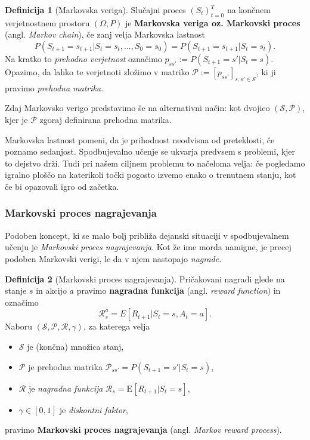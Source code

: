 \documentclass[12pt,a4paper]{amsart}
\theoremstyle{definition} %
\newtheorem{definicija}{Definicija}[section]
\theoremstyle{plain} %
\begin{document}
\begin{definicija}[Markovska veriga]
    Slučajni proces $(S_t)_{t=0}^T$ na končnem verjetnostnem prostoru 
    $(\Omega, P)$ je \textbf{Markovska veriga oz. Markovski proces} (angl. \textit{Markov 
    chain}), če zanj velja Markovska lastnost
    $$
    P(S_{t+1} = s_{t+1} | S_{t} = s_{t}, ..., S_0 = s_0) = P(S_{t+1} = s_{t+1} | S_{t} = s_{t}).
    $$
    Na kratko to \textit{prehodno verjetnost} označimo $p_{ss'} := P(S_{t+1} = s' | S_{t} = s)$.
    Opazimo, da lahko te verjetnoti zložimo v matriko $\mathcal{P} := 
    [p_{ss'}]_{s,s'\in \mathcal{S} }$, ki ji pravimo \textit{prehodna matrika}.

    Zdaj Markovsko verigo predstavimo še na alternativni način: kot dvojico $(\mathcal{S}, 
    \mathcal{P})$, kjer je $\mathcal{P}$ zgoraj definirana prehodna matrika.
\end{definicija}

Markovska lastnost pomeni, da je prihodnost neodvisna od preteklosti, če poznamo sedanjost. 
Spodbujevalno učenje se ukvarja predvsem s problemi, kjer to dejstvo drži. Tudi pri našem 
ciljnem problemu to načeloma velja: če pogledamo igralno ploščo na katerikoli točki pogosto 
izvemo enako o trenutnem stanju, kot če bi opazovali igro od začetka.

\subsubsection{Markovski proces nagrajevanja}
Podoben koncept, ki se malo bolj približa dejanski situaciji v spodbujevalnem učenju je \textit{
Markovski proces nagrajevanja}. Kot že ime morda namigne, je precej podoben Markovski verigi, le 
da v njem nastopajo \textit{nagrade}. 

\begin{definicija}[Markovski proces nagrajevanja]
    Pričakovani nagradi glede na stanje $s$ in akcijo $a$ pravimo \textbf{nagradna funkcija} (angl.
    \textit{reward function}) in označimo
    $$
    \mathcal{R}_s^a = E[R_{t+1} | S_{t} = s, A_t = a].
    $$
    Naboru $(\mathcal{S}, \mathcal{P}, \mathcal{R}, \gamma)$, za katerega velja
    \begin{itemize}
        \item $\mathcal{S}$ je (končna) množica stanj,
        \item $\mathcal{P}$ je prehodna matrika $\mathcal{P}_{ss'} = P(S_{t+1} = s' | S_{t} = s)$, 
        \item $\mathcal{R}$ je \textit{nagradna funkcija} 
                $\mathcal{R}_s = \mathrm{E}[R_{t+1} | S_{t} = s]$, 
        \item $\gamma \in [0,1]$ je \textit{diskontni faktor}, 
    \end{itemize}
    pravimo \textbf{Markovski proces nagrajevanja} (angl. \textit{Markov reward process}).
\end{definicija}
\end{document}
